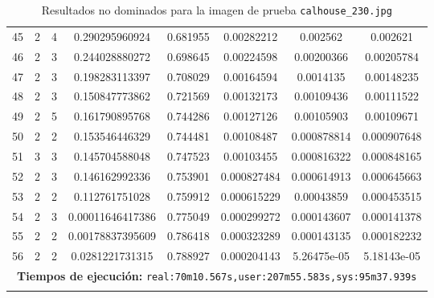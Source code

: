 \begin{longtable}{|c|c|c|c|c|c|c|c|}
45 & 2 & 4 & 0.290295960924 & 0.681955 & 0.00282212 & 0.002562 & 0.002621 \\
46 & 2 & 3 & 0.244028880272 & 0.698645 & 0.00224598 & 0.00200366 & 0.00205784 \\
47 & 2 & 3 & 0.198283113397 & 0.708029 & 0.00164594 & 0.0014135 & 0.00148235 \\
48 & 2 & 3 & 0.150847773862 & 0.721569 & 0.00132173 & 0.00109436 & 0.00111522 \\
49 & 2 & 5 & 0.161790895768 & 0.744286 & 0.00127126 & 0.00105903 & 0.00109671 \\
50 & 2 & 2 & 0.153546446329 & 0.744481 & 0.00108487 & 0.000878814 & 0.000907648 \\
51 & 3 & 3 & 0.145704588048 & 0.747523 & 0.00103455 & 0.000816322 & 0.000848165 \\
52 & 2 & 3 & 0.146162992336 & 0.753901 & 0.000827484 & 0.000614913 & 0.000645663 \\
53 & 2 & 2 & 0.112761751028 & 0.759912 & 0.000615229 & 0.00043859 & 0.000453515 \\
54 & 2 & 3 & 0.00011646417386 & 0.775049 & 0.000299272 & 0.000143607 & 0.000141378 \\
55 & 2 & 2 & 0.00178837395609 & 0.786418 & 0.000323289 & 0.000143135 & 0.000182232 \\
56 & 2 & 2 & 0.0281221731315 & 0.788927 & 0.000204143 & 5.26475e-05 & 5.18143e-05 \\
\hline
\multicolumn{8}{|c|}{\textbf{Tiempos de ejecución:} \texttt{real:70m10.567s,user:207m55.583s,sys:95m37.939s}}\\  \hline
\caption{Resultados no dominados para la imagen de prueba \texttt{calhouse\_230.jpg}}
\label{tab:calhouse_230}
\end{longtable}
\normalsize

